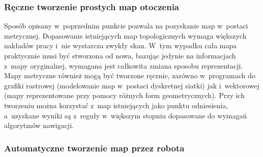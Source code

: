 \subsubsection{Ręczne tworzenie prostych map otoczenia}

Sposób opisany w~poprzednim punkcie pozwala na pozyskanie map w~postaci metrycznej.
Dopasowanie istniejących map topologicznych wymaga większych nakładów pracy
i~nie wystarcza zwykły skan. W~tym wypadku cała mapa praktycznie musi być
stworzona od nowa, bazując jedynie na informacjach z~mapy oryginalnej, wymagana
jest całkowita zmiana sposobu reprezentacji. Mapy metryczne również mogą być
tworzone ręcznie, zarówno w~programach do grafiki rastrowej (modelowanie map
w~postaci dyskretnej siatki) jak i~wektorowej (mapy reprezentowane przy pomocy
różnych form geometrycznych). Przy ich tworzeniu można korzystać z~map istniejących
jako punktu odniesienia, a~uzyskane wyniki są z~reguły w~większym stopniu
dopasowane do wymagań algorytmów nawigacji.

\subsubsection{Automatyczne tworzenie map przez robota}

